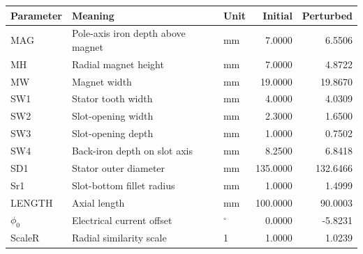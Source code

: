 \begin{tabular}{lp{.39\linewidth}lrr}\toprule
Parameter & Meaning & Unit & Initial & Perturbed\\\midrule
MAG & Pole-axis iron depth above magnet & mm & 7.0000 & 6.5506 \\
MH & Radial magnet height & mm & 7.0000 & 4.8722 \\
MW & Magnet width & mm & 19.0000 & 19.8670 \\
SW1 & Stator tooth width & mm & 4.0000 & 4.0309 \\
SW2 & Slot-opening width & mm & 2.3000 & 1.6500 \\
SW3 & Slot-opening depth & mm & 1.0000 & 0.7502 \\
SW4 & Back-iron depth on slot axis & mm & 8.2500 & 6.8418 \\
SD1 & Stator outer diameter & mm & 135.0000 & 132.6466 \\
Sr1 & Slot-bottom fillet radius & mm & 1.0000 & 1.4999 \\
LENGTH & Axial length & mm & 100.0000 & 90.0003 \\
$\phi_0$ & Electrical current offset & $^\circ$ & 0.0000 & -5.8231 \\
ScaleR & Radial similarity scale & 1 & 1.0000 & 1.0239 \\
\bottomrule\end{tabular}
